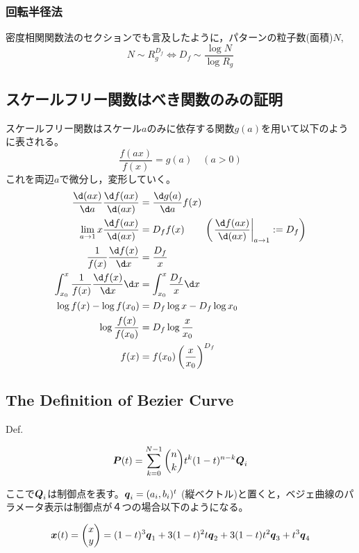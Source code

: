 \documentclass{ltjsarticle}
\begin{document}
\subsubsection{回転半径法}
密度相関関数法のセクションでも言及したように，パターンの粒子数(面積)$N$,
\begin{equation}
  N\sim R_g^{D_f} \Leftrightarrow D_f\sim\frac{\log N}{\log R_g}
\end{equation}
\subsection{スケールフリー関数はべき関数のみの証明}
スケールフリー関数はスケール$a$のみに依存する関数$g(a)$を用いて以下のように表される。
\begin{equation}
  \frac{f(ax)}{f(x)}=g(a) \quad (a>0)
\end{equation}
これを両辺$a$で微分し，変形していく。
\begin{equation}
  \begin{split}
    \frac{\d (ax)}{\d a}\frac{\d f(ax)}{\d (ax)}&=\frac{\d g(a)}{\d a}f(x)\\
    \lim_{a\to 1}x\frac{\d f(ax)}{\d (ax)}&=D_f f(x) \qquad\left(\left.\frac{\d f(ax)}{\d (ax)}\right|_{a\to1}:=D_f\right)\\
    \frac{1}{f(x)}\frac{\d f(x)}{\d x}&=\frac{D_f}{x}\\
    \int_{x_0}^{x} \frac{1}{f(x)}\frac{\d f(x)}{\d x}\d x&=\int_{x_0}^{x} \frac{D_f}{x}\d x\\
    \log f(x)-\log f(x_0)&=D_f\log x-D_f\log x_0\\
    \log \frac{f(x)}{f(x_0)}&=D_f\log \frac{x}{x_0}\\
    f(x)&=f(x_0)\left(\frac{x}{x_0}\right)^{D_f}
  \end{split}
\end{equation}
\subsection{The Definition of Bezier Curve}
Def.

\begin{equation}
  \vb*{P}(t)=\sum_{k=0}^{N-1}\binom{n}{k}t^k(1-t)^{n-k}\vb*{Q}_i
\end{equation}

ここで$\vb*{Q}_i$は制御点を表す。$\vb*{q}_i=(a_i,b_i)^t$ (縦ベクトル)と置くと，ベジェ曲線のパラメータ表示は制御点が４つの場合以下のようになる。

\begin{equation}
  \vb*{x}(t)=
  \begin{pmatrix}
    x \\ y  
  \end{pmatrix}
  =(1-t)^3\vb*{q}_1+3(1-t)^2t\vb*{q}_2+3(1-t)t^2\vb*{q}_3+t^3\vb*{q}_4
\end{equation}
\end{document}
